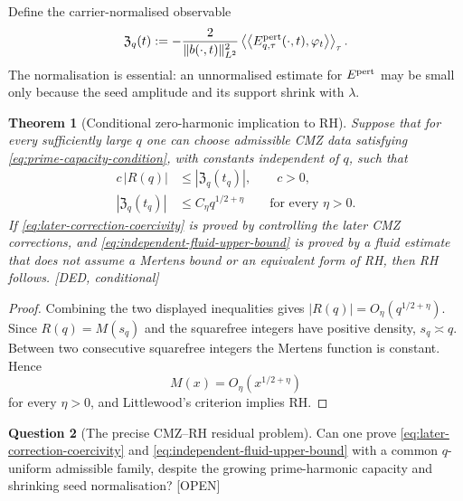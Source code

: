 \documentclass[11pt]{amsart}
\numberwithin{equation}{section}
\theoremstyle{plain}
\newtheorem{theorem}{Theorem}[section]
\theoremstyle{definition}
\newtheorem{question}[theorem]{Question}
\theoremstyle{remark}
\begin{document}
Define the carrier-normalised observable
\begin{equation}
 \mathfrak Z_q(t):=
 -\frac{2}{\|b(\cdot,t)\|_{L^2}^2}
 \left\langle\left\langle E^{\rm pert}_{q,\tau}(\cdot,t),
 \varphi_t\right\rangle\right\rangle_\tau.
\label{eq:normalised-full-residual}
\end{equation}
The normalisation is essential: an unnormalised estimate for
$E^{\rm pert}$ may be small only because the seed amplitude and its support
shrink with $\lambda$.

\begin{theorem}[Conditional zero-harmonic implication to RH]
\label{thm:conditional-zero-harmonic-RH}
Suppose that for every sufficiently large $q$ one can choose admissible CMZ
data satisfying \eqref{eq:prime-capacity-condition}, with constants
independent of $q$, such that
\begin{align}
 c\,|R(q)|&\le |\mathfrak Z_q(t_q)|,
 \qquad c>0,
\label{eq:later-correction-coercivity}\\
 |\mathfrak Z_q(t_q)|&\le C_\eta q^{1/2+\eta}
 \qquad\text{for every }\eta>0.
\label{eq:independent-fluid-upper-bound}
\end{align}
If \eqref{eq:later-correction-coercivity} is proved by controlling the later
CMZ corrections, and \eqref{eq:independent-fluid-upper-bound} is proved by a
fluid estimate that does not assume a Mertens bound or an equivalent form of
RH, then RH follows.  \textup{[DED, conditional]}
\end{theorem}

\begin{proof}
Combining the two displayed inequalities gives
$|R(q)|=O_\eta(q^{1/2+\eta})$.  Since $R(q)=M(s_q)$ and the squarefree
integers have positive density, $s_q\asymp q$.  Between two consecutive
squarefree integers the Mertens function is constant.  Hence
\begin{equation}
 M(x)=O_\eta(x^{1/2+\eta})
 \label{eq:Mertens-from-zero-mode}
\end{equation}
for every $\eta>0$, and Littlewood's criterion implies RH.
\end{proof}

\begin{question}[The precise CMZ--RH residual problem]
\label{q:zero-harmonic-residual}
Can one prove \eqref{eq:later-correction-coercivity} and
\eqref{eq:independent-fluid-upper-bound} with a common $q$-uniform admissible
family, despite the growing prime-harmonic capacity and shrinking seed
normalisation?  \textup{[OPEN]}
\end{question}
\end{document}
